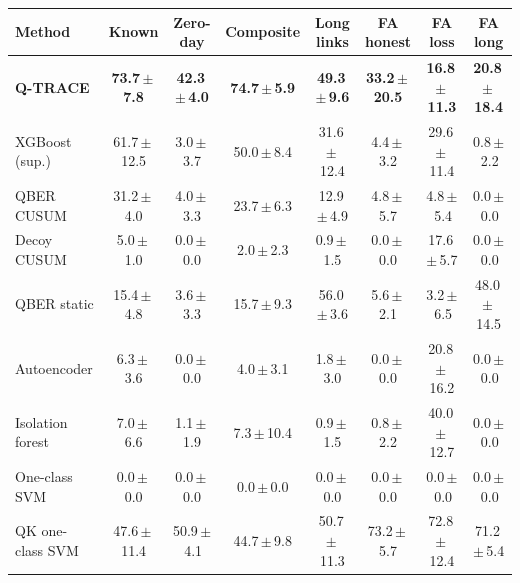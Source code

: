 \begin{tabular}{lccccccc}
\toprule
Method & Known & Zero-day & Composite & Long links & FA honest & FA loss & FA long \\
\midrule
\textbf{Q-TRACE} & \textbf{73.7\,$\pm$\,7.8} & \textbf{42.3\,$\pm$\,4.0} & \textbf{74.7\,$\pm$\,5.9} & \textbf{49.3\,$\pm$\,9.6} & \textbf{33.2\,$\pm$\,20.5} & \textbf{16.8\,$\pm$\,11.3} & \textbf{20.8\,$\pm$\,18.4} \\
XGBoost (sup.) & 61.7\,$\pm$\,12.5 & 3.0\,$\pm$\,3.7 & 50.0\,$\pm$\,8.4 & 31.6\,$\pm$\,12.4 & 4.4\,$\pm$\,3.2 & 29.6\,$\pm$\,11.4 & 0.8\,$\pm$\,2.2 \\
QBER CUSUM & 31.2\,$\pm$\,4.0 & 4.0\,$\pm$\,3.3 & 23.7\,$\pm$\,6.3 & 12.9\,$\pm$\,4.9 & 4.8\,$\pm$\,5.7 & 4.8\,$\pm$\,5.4 & 0.0\,$\pm$\,0.0 \\
Decoy CUSUM & 5.0\,$\pm$\,1.0 & 0.0\,$\pm$\,0.0 & 2.0\,$\pm$\,2.3 & 0.9\,$\pm$\,1.5 & 0.0\,$\pm$\,0.0 & 17.6\,$\pm$\,5.7 & 0.0\,$\pm$\,0.0 \\
QBER static & 15.4\,$\pm$\,4.8 & 3.6\,$\pm$\,3.3 & 15.7\,$\pm$\,9.3 & 56.0\,$\pm$\,3.6 & 5.6\,$\pm$\,2.1 & 3.2\,$\pm$\,6.5 & 48.0\,$\pm$\,14.5 \\
Autoencoder & 6.3\,$\pm$\,3.6 & 0.0\,$\pm$\,0.0 & 4.0\,$\pm$\,3.1 & 1.8\,$\pm$\,3.0 & 0.0\,$\pm$\,0.0 & 20.8\,$\pm$\,16.2 & 0.0\,$\pm$\,0.0 \\
Isolation forest & 7.0\,$\pm$\,6.6 & 1.1\,$\pm$\,1.9 & 7.3\,$\pm$\,10.4 & 0.9\,$\pm$\,1.5 & 0.8\,$\pm$\,2.2 & 40.0\,$\pm$\,12.7 & 0.0\,$\pm$\,0.0 \\
One-class SVM & 0.0\,$\pm$\,0.0 & 0.0\,$\pm$\,0.0 & 0.0\,$\pm$\,0.0 & 0.0\,$\pm$\,0.0 & 0.0\,$\pm$\,0.0 & 0.0\,$\pm$\,0.0 & 0.0\,$\pm$\,0.0 \\
QK one-class SVM & 47.6\,$\pm$\,11.4 & 50.9\,$\pm$\,4.1 & 44.7\,$\pm$\,9.8 & 50.7\,$\pm$\,11.3 & 73.2\,$\pm$\,5.7 & 72.8\,$\pm$\,12.4 & 71.2\,$\pm$\,5.4 \\
\bottomrule
\end{tabular}
